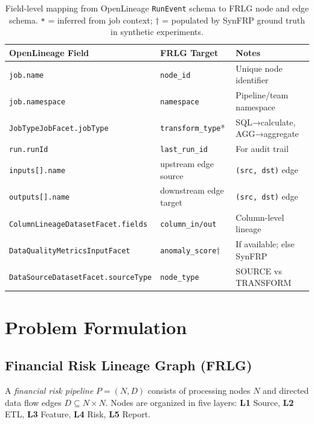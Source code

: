 \documentclass{article}
\begin{document}
\begin{table}[h]
  \centering
  \caption{Field-level mapping from OpenLineage \texttt{RunEvent} schema to
           FRLG node and edge schema.
           \texttt{*} = inferred from job context; † = populated by SynFRP
           ground truth in synthetic experiments.}
  \label{tab:openlineage}
  \small
  \begin{tabular}{lll}
    \toprule
    OpenLineage Field & FRLG Target & Notes \\
    \midrule
    \texttt{job.name}                          & \texttt{node\_id}          & Unique node identifier \\
    \texttt{job.namespace}                      & \texttt{namespace}         & Pipeline/team namespace \\
    \texttt{JobTypeJobFacet.jobType}            & \texttt{transform\_type}*  & SQL→calculate, AGG→aggregate \\
    \texttt{run.runId}                          & \texttt{last\_run\_id}     & For audit trail \\
    \texttt{inputs[].name}                      & upstream edge source       & \texttt{(src, dst)} edge \\
    \texttt{outputs[].name}                     & downstream edge target     & \texttt{(src, dst)} edge \\
    \texttt{ColumnLineageDatasetFacet.fields}   & \texttt{column\_in/out}    & Column-level lineage \\
    \texttt{DataQualityMetricsInputFacet}       & \texttt{anomaly\_score}†   & If available; else SynFRP \\
    \texttt{DataSourceDatasetFacet.sourceType}  & \texttt{node\_type}        & SOURCE vs TRANSFORM \\
    \bottomrule
  \end{tabular}
\end{table}

\section{Problem Formulation}
\label{sec:problem}

\subsection{Financial Risk Lineage Graph (FRLG)}

A \emph{financial risk pipeline} $P = (N, D)$ consists of processing nodes
$N$ and directed data flow edges $D \subseteq N \times N$.
Nodes are organized in five layers: \textbf{L1} Source, \textbf{L2} ETL,
\textbf{L3} Feature, \textbf{L4} Risk, \textbf{L5} Report.
\end{document}
